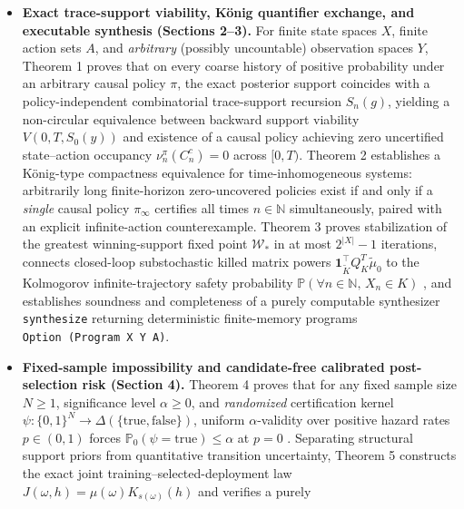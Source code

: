 \documentclass[11pt,a4paper]{article}
\providecommand{\tightlist}{\setlength{\itemsep}{2pt}\setlength{\parskip}{0pt}}
\begin{document}
\begin{itemize}
\tightlist
\item
  \textbf{Exact trace-support viability, König quantifier exchange, and
  executable synthesis (Sections 2--3).} For finite state spaces \(X\),
  finite action sets \(A\), and \emph{arbitrary} (possibly uncountable)
  observation spaces \(Y\), Theorem 1 proves that on every coarse
  history of positive probability under an arbitrary causal policy
  \(\pi\), the exact posterior support coincides with a
  policy-independent combinatorial trace-support recursion \(S_n(g)\),
  yielding a non-circular equivalence between backward support viability
  \(V(0, T, S_0(y))\) and existence of a causal policy achieving zero
  uncertified state--action occupancy \(\nu_n^\pi(C_n^c) = 0\) across
  \([0,T)\). Theorem 2 establishes a König-type compactness equivalence
  \citep{konig1927} for time-inhomogeneous systems: arbitrarily long
  finite-horizon zero-uncovered policies exist if and only if a
  \emph{single} causal policy \(\pi_\infty\) certifies all times
  \(n \in \mathbb{N}\) simultaneously, paired with an explicit
  infinite-action counterexample. Theorem 3 proves stabilization of the
  greatest winning-support fixed point \(\mathcal{W}_*\)
  \citep{tarski1955, aubinCellina1984, aubin1991} in at most
  \(2^{|X|} - 1\) iterations, connects closed-loop substochastic killed
  matrix powers
  \(\mathbf{1}_{\widetilde{K}}^\top Q_K^T \widetilde{\mu}_0\)
  \citep{darrochSeneta1965, seneta1981, collet2013} to the Kolmogorov
  infinite-trajectory safety probability
  \(\mathbb{P}(\forall n \in \mathbb{N},\, X_n \in K)\)
  \citep{kallenberg2021}, and establishes soundness and completeness of
  a purely computable synthesizer \texttt{synthesize} returning
  deterministic finite-memory programs
  \texttt{Option\ (Program\ X\ Y\ A)}.
\item
  \textbf{Fixed-sample impossibility and candidate-free calibrated
  post-selection risk (Section 4).} Theorem 4 proves that for any fixed
  sample size \(N \ge 1\), significance level \(\alpha \ge 0\), and
  \emph{randomized} certification kernel
  \(\psi : \{0,1\}^N \to \Delta(\{\mathrm{true}, \mathrm{false}\})\),
  uniform \(\alpha\)-validity over positive hazard rates \(p \in (0,1)\)
  forces \(\mathbb{P}_0(\psi = \mathrm{true}) \le \alpha\) at \(p = 0\)
  \citep{leCam1973, tsybakov2009}. Separating structural support priors
  from quantitative transition uncertainty, Theorem 5 constructs the
  exact joint training--selected-deployment law
  \(J(\omega, h) = \mu(\omega) K_{s(\omega)}(h)\) and verifies a purely

\end{itemize}
\end{document}

